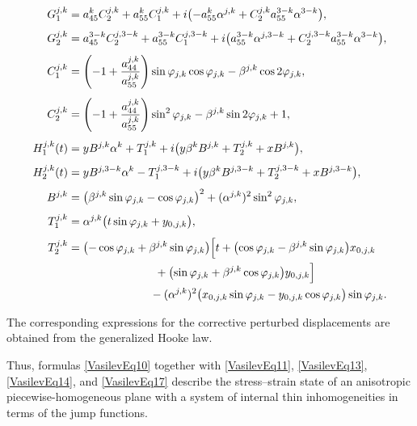 \begin{align*}
	G_{1}^{j,k}
	&=
	a_{45}^{k}C_{2}^{j,k}
	+
	a_{55}^{k}C_{1}^{j,k}
	+
	i\bigl(-a_{55}^{k}\alpha^{j,k}+C_{2}^{j,k}a_{55}^{3-k}\alpha^{3-k}\bigr),
	\\[4pt]
	G_{2}^{j,k}
	&=
	a_{45}^{3-k}C_{2}^{j,3-k}
	+
	a_{55}^{3-k}C_{1}^{j,3-k}
	+
	i\bigl(a_{55}^{3-k}\alpha^{j,3-k}+C_{2}^{j,3-k}a_{55}^{3-k}\alpha^{3-k}\bigr),
	\\[4pt]
	C_{1}^{j,k}
	&=
	\left(-1+\frac{a_{44}^{j,k}}{a_{55}^{j,k}}\right)
	\sin\varphi_{j,k}\cos\varphi_{j,k}
	-
	\beta^{j,k}\cos 2\varphi_{j,k},
	\\[4pt]
	C_{2}^{j,k}
	&=
	\left(-1+\frac{a_{44}^{j,k}}{a_{55}^{j,k}}\right)
	\sin^{2}\varphi_{j,k}
	-
	\beta^{j,k}\sin 2\varphi_{j,k}
	+
	1,
	\\[4pt]
	H_{1}^{j,k}(t)
	&=
	yB^{j,k}\alpha^{k}
	+
	T_{1}^{j,k}
	+
	i\bigl(y\beta^{k}B^{j,k}+T_{2}^{j,k}+xB^{j,k}\bigr),
	\\[4pt]
	H_{2}^{j,k}(t)
	&=
	yB^{j,3-k}\alpha^{k}
	-
	T_{1}^{j,3-k}
	+
	i\bigl(y\beta^{k}B^{j,3-k}+T_{2}^{j,3-k}+xB^{j,3-k}\bigr),
	\\[4pt]
	B^{j,k}
	&=
	\bigl(\beta^{j,k}\sin\varphi_{j,k}-\cos\varphi_{j,k}\bigr)^{2}
	+
	(\alpha^{j,k})^{2}\sin^{2}\varphi_{j,k},
	\\[4pt]
	T_{1}^{j,k}
	&=
	\alpha^{j,k}\bigl(t\sin\varphi_{j,k}+y_{0,j,k}\bigr),
	\\[4pt]
	T_{2}^{j,k}
	&=
	\begin{multlined}[t]
	\bigl(-\cos\varphi_{j,k}+\beta^{j,k}\sin\varphi_{j,k}\bigr)
	\Bigl[
	t
	+
	\bigl(\cos\varphi_{j,k}-\beta^{j,k}\sin\varphi_{j,k}\bigr)x_{0,j,k}
	\\
	+
	\bigl(\sin\varphi_{j,k}+\beta^{j,k}\cos\varphi_{j,k}\bigr)y_{0,j,k}
	\Bigr]
	\\
	-
	(\alpha^{j,k})^{2}
	\bigl(x_{0,j,k}\sin\varphi_{j,k}-y_{0,j,k}\cos\varphi_{j,k}\bigr)
	\sin\varphi_{j,k}.
	\end{multlined}
\end{align*}

The corresponding expressions for the corrective perturbed displacements are obtained from the generalized Hooke law.

Thus, formulas \eqref{VasilevEq10} together with \eqref{VasilevEq11}, \eqref{VasilevEq13}, \eqref{VasilevEq14}, and \eqref{VasilevEq17} describe the stress--strain state of an anisotropic piecewise-homogeneous plane with a system of internal thin inhomogeneities in terms of the jump functions.

